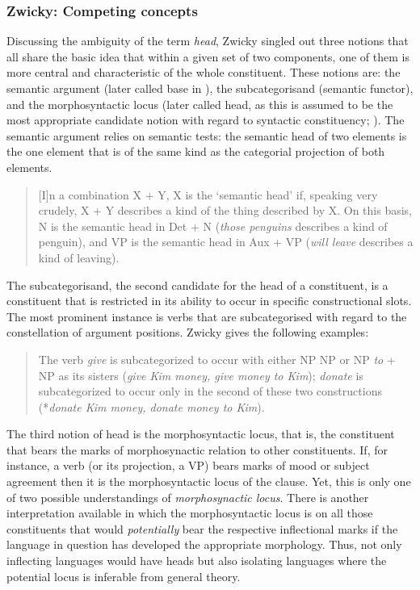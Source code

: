 \subsubsection{Zwicky: Competing concepts}\label{sec:Zwicky}

Discussing the ambiguity of the term \textit{head}, Zwicky singled out three notions that all share the basic idea that within a given set of two components, one of them is more central and characteristic of the whole constituent. These notions are: the semantic argument (later called base in \citealt{zwicky199313}), the subcategorisand (semantic functor), and the morphosyntactic locus (later called head, as this is assumed to be the most appropriate candidate notion with regard to syntactic constituency; \citealt[3]{zwicky1985heads1}). The semantic argument relies on semantic tests: the semantic head of two elements is the one element that is of the same kind as the categorial projection of both elements.

\begin{quote}
[I]n a combination X + Y, X is the `semantic head' if, speaking very crudely, X + Y describes a kind of the thing described by X. On this basis, N is the semantic head in Det + N (\textit{those penguins} describes a kind of penguin), and VP is the semantic head in Aux + VP (\textit{will leave} describes a kind of leaving). \citep[4]{zwicky1985heads1}
\end{quote}

The subcategorisand, the second candidate for the head of a constituent, is a constituent that is restricted in its ability to occur in specific constructional slots. The most prominent instance is verbs that are subcategorised with regard to the constellation of argument positions. Zwicky gives the following examples:

\begin{quote}
The verb \textit{give} is subcategorized to occur with either NP NP or NP \textit{to} + NP as its sisters (\textit{give Kim money, give money to Kim}); \textit{donate} is subcategorized to occur only in the second of these two constructions (*\textit{donate Kim money, donate money to Kim}). \citep[5]{zwicky1985heads1}
\end{quote}

The third notion of head is the morphosyntactic locus, that is, the constituent that bears the marks of morphosynactic relation to other constituents. If, for instance, a verb (or its projection, a VP) bears marks of mood or subject agreement then it is the morphosyntactic locus of the clause. Yet, this is only one of two possible understandings of \textit{morphosynactic locus}. There is another interpretation available in which the morphosyntactic locus is on all those constituents that would \emph{potentially} bear the respective inflectional marks if the language in question has developed the appropriate morphology. Thus, not only inflecting languages would have heads but also isolating languages where the potential locus is inferable from general theory.

